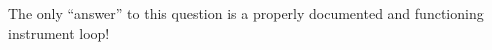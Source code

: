 





The only ``answer'' to this question is a properly documented and functioning instrument loop!
 









